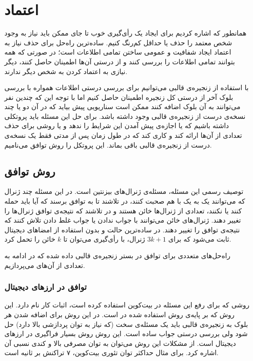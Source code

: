 \section{اعتماد}
همانطور که اشاره کردیم برای ایجاد یک رأی‌گیری خوب تا جای ممکن باید نیاز به وجود شخص معتمد را حذف یا حداقل کم‌رنگ کنیم. ساده‌ترین راه‌حل برای حذف نیاز به اعتماد ایجاد شفافیت و عمومی ساختن تمامی اطلاعات است؛ در صورتی که همه بتوانند تمامی اطلاعات را بررسی کنند و از درستی آن‌ها اطمینان حاصل کنند، دیگر نیازی به اعتماد کردن به شخص دیگر ندارند. 
\par 
با استفاده از زنجیره‌ی قالبی می‌‌توانیم برای بررسی درستی اطلاعات همواره با بررسی بلوک آخر از درستی کل زنجیره اطمینان حاصل کنیم اما با توجه این که چندین نفر می‌توانند به آن بلوک اضافه کنند ممکن است سناریویی پیش بیاید که در آن دو یا چند نسخه‌ی درست از زنجیره‌ی قالبی وجود داشته باشد. برای حل این مسئله باید پروتکلی داشته باشیم که یا اجازه‌ی پیش آمدن این شرایط را ندهد و یا روشی برای حذف تعدادی از آن‌ها ارائه کند و کاری کند که در طول زمان پس از مدتی فقط یک نسخه‌ی درست از زنجیره‌ی قالبی باقی بماند. این پروتکل را روش توافق می‌نامیم.
\subsection{روش توافق}
توصیف رسمی این مسئله، مسئله‌ی ژنرال‌های بیزنتین 
\cite{byzantine}
است. در این مسئله چند ژنرال که می‌توانند یک به یک با هم صحبت کنند، در تلاشند تا به توافق برسند که آیا باید حمله کنند یا نکنند، تعدادی از ژنرال‌ها خائن هستند و در تلاشند که نتیجه‌ی توافق ژنرال‌ها را تغییر دهند. ژنرال‌های خائن می‌توانند با جواب ندادن یا جواب غلط دادن تلاش کنند که نتیجه‌ی توافق را تغییر دهند. در ساده‌ترین حالت و بدون استفاده از امضا‌های دیجیتال ثابت می‌شود که برای $ 3k + 1 $ ژنرال، با رأی‌گیری می‌توان تا $ k $ خائن را تحمل کرد. 
\par
راه‌حل‌های متعددی برای توافق 
در بستر زنجیره‌ی قالبی داده شده که در ادامه به تعدادی از آن‌های می‌پردازیم.
\subsubsection{توافق در ارزهای دیجیتال}
روشی که 
\cite{bitcoin}
برای رفع این مسئله در بیت‌کوین استفاده کرده است، اثبات کار 
نام دارد. این روش که بر پایه‌ی روش استفاده شده در 
\cite{hashcash}
است. در این روش برای اضافه شدن هر بلوک به زنجیره‌ی قالبی باید یک مسئله‌ی سخت (که نیاز به توان پردازشی بالا دارد) حل شود ولی بررسی درستی جواب ساده است. این روش روش بسیار فراگیری در ارز‌های دیجیتال است. از مشکلات این روش می‌توان به توان مصرفی بالا و کندی نسبی آن اشاره کرد. برای مثال حداکثر توان تئوری بیت‌کوین، ۷ تراکنش بر ثانیه است. 

